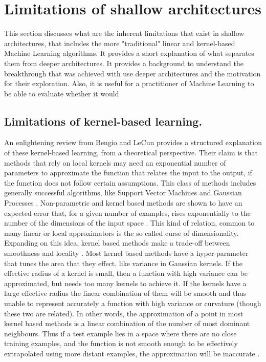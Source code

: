 \documentclass[a4paper]{article}
\begin{document}
	
\section{Limitations of shallow architectures}
\label{sec:Limitations}
	This section discusses what are the inherent limitations that exist in shallow architectures, that includes the more "traditional" linear and kernel-based Machine Learning algorithms. It provides a short explanation of what separates them from deeper architectures. It provides a background to understand the breakthrough that was achieved with use deeper architectures and the motivation for their exploration. Also, it is useful for a practitioner of Machine Learning to be able to evaluate whether it would 
	\subsection{Limitations of kernel-based learning.}
	\label{sub: kernel limitations}
		An enlightening review from Bengio and LeCun \cite{Bengio2007} provides a structured explanation of these kernel-based learning, from a theoretical perspective. Their claim is that methods that rely on local kernels may need an exponential number of parameters to approximate the function that relates the input to the output, if the function does not follow certain assumptions. This class of methods includes generally successful algorithms, like Support Vector Machines \cite{Boser1992,Cortes1995} and Gaussian Processes \cite{Williams2006}.
		Non-parametric and kernel based methods are shown to have an expected error that, for a given number of examples, rises exponentially to the number of the dimensions of the input space \cite{Hardle2004}. This kind of relation, common to many linear or local approximators is the so called curse of dimensionality.
		Expanding on this idea, kernel based methods make a trade-off between smoothness and locality \cite{Bengio2007}. Most kernel based methods have a hyper-parameter that tunes the area that they effect, like variance in Gaussian kernels. If the effective radius of a kernel is small, then a function with high variance can be approximated, but needs too many kernels to achieve it. If the kernels have a large effective radius the linear combination of them will be smooth and thus unable to represent accurately a function with high variance or curvature (though these two are related). In other words, the approximation of a point in most kernel based methods is a linear combination of the number of most dominant neighbours. Thus if a test example lies in a space where there are no close training examples, and the function is not smooth enough to be effectively extrapolated using more distant examples, the approximation will be inaccurate \cite{Bengio2013a}.
		
\end{document}
